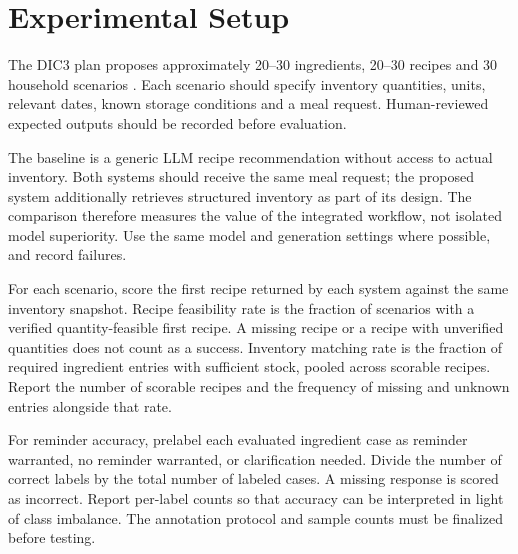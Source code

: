 \section{Experimental Setup}
The DIC3 plan proposes approximately 20--30 ingredients, 20--30 recipes and 30 household scenarios \cite{dic3plan}. Each scenario should specify inventory quantities, units, relevant dates, known storage conditions and a meal request. Human-reviewed expected outputs should be recorded before evaluation.

The baseline is a generic LLM recipe recommendation without access to actual inventory. Both systems should receive the same meal request; the proposed system additionally retrieves structured inventory as part of its design. The comparison therefore measures the value of the integrated workflow, not isolated model superiority. Use the same model and generation settings where possible, and record failures.

For each scenario, score the first recipe returned by each system against the same inventory snapshot. Recipe feasibility rate is the fraction of scenarios with a verified quantity-feasible first recipe. A missing recipe or a recipe with unverified quantities does not count as a success. Inventory matching rate is the fraction of required ingredient entries with sufficient stock, pooled across scorable recipes. Report the number of scorable recipes and the frequency of missing and unknown entries alongside that rate.

For reminder accuracy, prelabel each evaluated ingredient case as reminder warranted, no reminder warranted, or clarification needed. Divide the number of correct labels by the total number of labeled cases. A missing response is scored as incorrect. Report per-label counts so that accuracy can be interpreted in light of class imbalance. The annotation protocol and sample counts must be finalized before testing.
